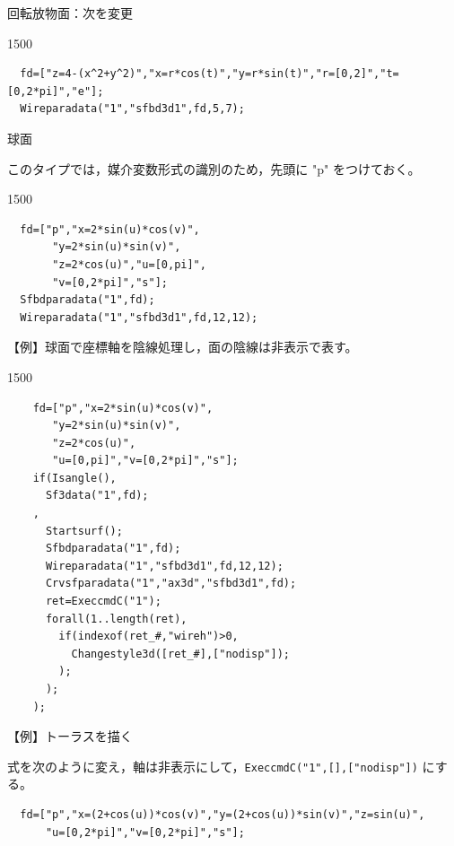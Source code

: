 \documentclass[papersize,a4paper,12pt,uplatex]{jsarticle}
\begin{document}
\begin{description}
回転放物面：次を変更

\begin{layer}{150}{0}
\end{layer}
\begin{verbatim}
  fd=["z=4-(x^2+y^2)","x=r*cos(t)","y=r*sin(t)","r=[0,2]","t=[0,2*pi]","e"];
  Wireparadata("1","sfbd3d1",fd,5,7);
\end{verbatim}
\vspace{25mm}

球面

このタイプでは，媒介変数形式の識別のため，先頭に "p" をつけておく。

\begin{layer}{150}{0}
\end{layer}
\begin{verbatim}
  fd=["p","x=2*sin(u)*cos(v)",
       "y=2*sin(u)*sin(v)",
       "z=2*cos(u)","u=[0,pi]",
       "v=[0,2*pi]","s"];
  Sfbdparadata("1",fd);
  Wireparadata("1","sfbd3d1",fd,12,12); 
\end{verbatim}

\vspace{8mm}

\vspace{\baselineskip}
【例】球面で座標軸を陰線処理し，面の陰線は非表示で表す。

\begin{layer}{150}{0}
\end{layer}

\begin{verbatim}
    fd=["p","x=2*sin(u)*cos(v)",
       "y=2*sin(u)*sin(v)",
       "z=2*cos(u)",
       "u=[0,pi]","v=[0,2*pi]","s"];
    if(Isangle(),
      Sf3data("1",fd);
    ,
      Startsurf();
      Sfbdparadata("1",fd);
      Wireparadata("1","sfbd3d1",fd,12,12);
      Crvsfparadata("1","ax3d","sfbd3d1",fd);
      ret=ExeccmdC("1");
      forall(1..length(ret),
        if(indexof(ret_#,"wireh")>0,
          Changestyle3d([ret_#],["nodisp"]);
        );
      );
    );
\end{verbatim}
【例】トーラスを描く

式を次のように変え，軸は非表示にして，\verb|ExeccmdC("1",[],["nodisp"])| にする。

\begin{verbatim}
  fd=["p","x=(2+cos(u))*cos(v)","y=(2+cos(u))*sin(v)","z=sin(u)",
      "u=[0,2*pi]","v=[0,2*pi]","s"];
\end{verbatim}
\vspace{\baselineskip}
    \begin{center}   \end{center}


\end{description}
\end{document}
